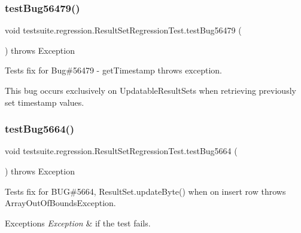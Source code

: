 \subsubsection{\texorpdfstring{test\+Bug56479()}{testBug56479()}}
{\footnotesize\ttfamily void testsuite.\+regression.\+Result\+Set\+Regression\+Test.\+test\+Bug56479 (\begin{DoxyParamCaption}{ }\end{DoxyParamCaption}) throws Exception}

Tests fix for Bug\#56479 -\/ get\+Timestamp throws exception.

This bug occurs exclusively on Updatable\+Result\+Sets when retrieving previously set timestamp values. \mbox{\label{classtestsuite_1_1regression_1_1_result_set_regression_test_aaf08edff0fccda829794321f5eed7ca3}} 
\subsubsection{\texorpdfstring{test\+Bug5664()}{testBug5664()}}
{\footnotesize\ttfamily void testsuite.\+regression.\+Result\+Set\+Regression\+Test.\+test\+Bug5664 (\begin{DoxyParamCaption}{ }\end{DoxyParamCaption}) throws Exception}

Tests fix for B\+UG\#5664, Result\+Set.\+update\+Byte() when on insert row throws Array\+Out\+Of\+Bounds\+Exception.


\begin{DoxyExceptions}{Exceptions}
{\em Exception} & if the test fails. \\
\hline
\end{DoxyExceptions}
\mbox{\label{classtestsuite_1_1regression_1_1_result_set_regression_test_a08e8e83e8ac874e16cd5aa89e43f6862}} 
